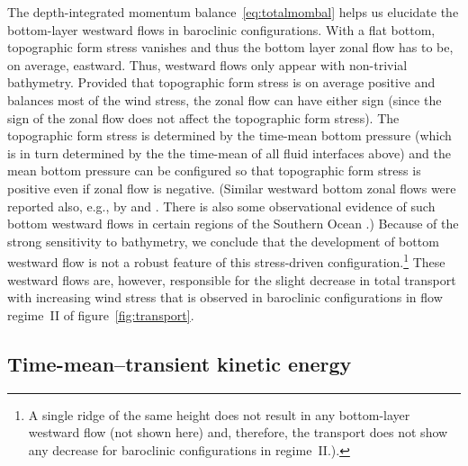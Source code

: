 \documentclass{agujournal2019}
\begin{document}
The depth-integrated momentum balance~\eqref{eq:totalmombal} helps us elucidate the bottom-layer westward flows in baroclinic configurations. With a flat bottom, topographic form stress vanishes and thus the bottom layer zonal flow has to be, on average, eastward. Thus, westward flows only appear with non-trivial bathymetry. Provided that topographic form stress is on average positive and balances most of the wind stress, the zonal flow can have either sign (since the sign of the zonal flow does {\color{black} not} affect the topographic form stress). The topographic form stress is determined by the time-mean bottom pressure (which is in turn determined by the the time-mean of all fluid interfaces above) and the mean bottom pressure can be configured so that topographic form stress is positive even if zonal flow is negative. (Similar westward bottom zonal flows were reported also, e.g., by  and . There is also some observational evidence of such bottom westward flows in certain regions of the Southern Ocean \cite{Cunningham-Barker-1996}.) Because of the strong sensitivity to bathymetry, we conclude that the development of bottom westward flow is not a robust feature of this stress-driven configuration.\footnote{A single ridge of the same height does not result in any bottom-layer westward flow (not shown here) {\color{black}and, therefore, the transport does not show any decrease for baroclinic configurations in regime~II.}).} These westward flows are, however,  responsible for the slight decrease in total transport with increasing wind stress that is observed in baroclinic configurations in flow regime~II of figure~\ref{fig:transport}.




\subsection{Time-mean--transient kinetic energy}\label{sec:resultdetails2}
\end{document}
